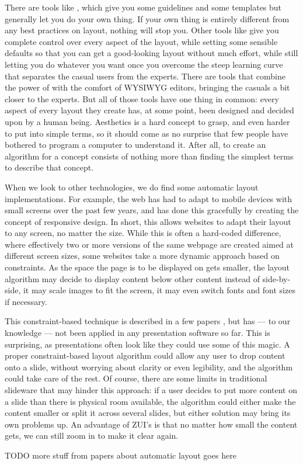    There are tools like \ppt, which give you some guidelines and some templates
   but generally let you do your own thing. If your own thing is entirely
   different from any best practices on layout, nothing will stop you. Other
   tools like \latex give you complete control over every aspect of the layout,
   while setting some sensible defaults so that you can get a good-looking
   layout without much effort, while still letting you do whatever you want
   once you overcome the steep learning curve that separates the casual users
   from the experts. There are tools that combine the power of \latex with the
   comfort of WYSIWYG editors, bringing the casuals a bit closer to the
   experts. But all of those tools have one thing in common: every aspect of
   every layout they create has, at some point, been designed and decided upon
   by a human being. Aesthetics is a hard concept to grasp, and even harder to
   put into simple terms, so it should come as no surprise that few people have
   bothered to program a computer to understand it. After all, to create an
   algorithm for a concept consists of nothing more than finding the simplest
   terms to describe that concept.

   When we look to other technologies, we do find some automatic layout
   implementations. For example, the web has had to adapt to mobile devices
   with small screens over the past few years, and has done this gracefully by
   creating the concept of responsive design. In short, this allows websites to
   adapt their layout to any screen, no matter the size. While this is often a
   hard-coded difference, where effectively two or more versions of the same
   webpage are created aimed at different screen sizes, some websites take a
   more dynamic approach based on constraints. As the space the page is to be
   displayed on gets smaller, the layout algorithm may decide to display
   content below other content instead of side-by-side, it may scale images to
   fit the screen, it may even switch fonts and font sizes if necessary.

   This constraint-based technique is described in a few papers
   \citep{lok-1,hurst-1}, but has --- to our knowledge --- not been applied in
   any presentation software so far. This is surprising, as presentations often
   look like they could use some of this magic. A proper constraint-based
   layout algorithm could allow any user to drop content onto a slide, without
   worrying about clarity or even legibility, and the algorithm could take care
   of the rest. Of course, there are some limits in traditional slideware that
   may hinder this approach: if a user decides to put more content on a slide
   than there is physical room available, the algorithm could either make the
   content smaller or split it across several slides, but either solution may
   bring its own problems up. An advantage of ZUI's is that no matter how small
   the content gets, we can still zoom in to make it clear again.

   TODO more stuff from papers about automatic layout goes here

